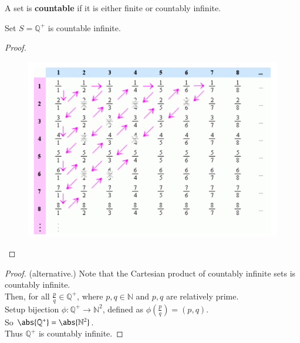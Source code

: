 \documentclass[10pt]{article}
\begin{document}
		\begin{definition}
			A set is \textbf{countable} if it is either finite or countably infinite.
		\end{definition}
		
		\begin{theorem}
			Set $S = \mathbb{Q}^+$ is countable infinite.
		\end{theorem}
		\begin{proof}
			\begin{figure}[h]
				\centering
				\includegraphics[width=0.5\linewidth]{figures/countinfproof}
			\end{figure}
		\end{proof}
		\begin{proof}(alternative.)
			Note that the Cartesian product of countably infinite sets is countably infinite. \\
			Then, for all $\frac{p}{q} \in \mathbb{Q}^+$, where $p, q \in \mathbb{N}$ and $p, q$ are relatively prime. \\
			Setup bijection $\phi:\mathbb{Q}^+ \to \mathbb{N}^2$, defined as $\phi(\frac{p}{q}) = (p,q)$. \\
			So $\abs{\mathbb{Q}^+} = \abs{\mathbb{N}^2}$. \\
			Thus $\mathbb{Q}^+$ is countably infinite.
		\end{proof}
		
\end{document}
